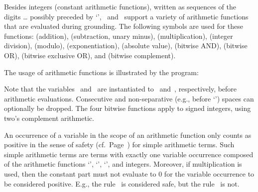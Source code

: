 Besides integers (constant arithmetic functions),
written as sequences of the digits \dots{}
possibly preceded by `\code{-}',
\gringo\ and \clingo\ support a variety of arithmetic functions that
are evaluated during grounding.
The following symbols are used for these functions:
\code{+} (addition),
\code{-} (subtraction, unary minus),
\code{*} (multiplication),
\code{/} (integer division),
\code{\textbackslash} (modulo),
\code{**} (exponentiation),
\code{|$\cdot$|} (absolute value),
\code{\&} (bitwise AND),
 (bitwise OR),
\code{\^} (bitwise exclusive OR), and
\code{\textasciitilde} (bitwise complement).

\begin{example}\label{ex:arith:fun}
The usage of arithmetic functions is illustrated by the program:%
%

%
Note that the variables~ and~ are instantiated to~ and~,
respectively, before arithmetic evaluations.
Consecutive and non-separative (e.g., before `\code{(}')
spaces can optionally be dropped.
The four bitwise functions apply to signed integers,
using two's complement arithmetic.
\end{example}

\begin{note}\label{note:simple}
An occurrence of a variable in the scope of an arithmetic function
only counts as positive in the sense of safety (cf.\ Page~\pageref{pg:safe}) for simple arithmetic terms.
Such simple arithmetic terms are terms with exactly one variable occurrence
composed of the arithmetic functions `\code{+}', `\code{-}', `\code{*}', and integers.
Moreover,
if multiplication is used, then the constant part must not evaluate to $0$ for the variable occurrence to be considered positive.
E.g., the rule~
is considered safe, but
the rule~ is not.
\end{note}

